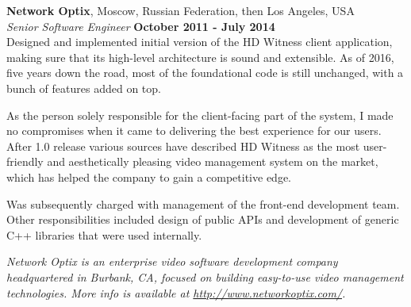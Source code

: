 \documentclass[margin,line]{CV}
\begin{document}
\begin{resume}
\ifdefined\superofficial
    \pagebreak
\fi
\ifdefined\superofficial\else
    \pagebreak    
\fi
    
    \textbf{Network Optix}, Moscow, Russian Federation, then Los Angeles, USA \vspace{2mm}\\\vspace{1mm}%
    \textsl{Senior Software Engineer} \hfill \textbf{October 2011 - July 2014}\\ 
    Designed and implemented initial version of the HD Witness client application, making sure that its high-level architecture is sound and extensible. As of 2016, five years down the road, most of the foundational code is still unchanged, with a bunch of features added on top.

    As the person solely responsible for the client-facing part of the system, I made no compromises when it came to delivering the best experience for our users. After 1.0 release various sources have described HD Witness as the most user-friendly and aesthetically pleasing video management system on the market, which has helped the company to gain a competitive edge.

    Was subsequently charged with management of the front-end development team. Other responsibilities included design of public APIs and development of generic C++ libraries that were used internally.
    
    

\ifdefined\superofficial
    {\footnotesize\textit{Network Optix is an enterprise video software development company headquartered in Burbank, CA, focused on building easy-to-use video management technologies. More info is available at \url{http://www.networkoptix.com/}.}}
\fi
    


\end{resume}
\end{document}
